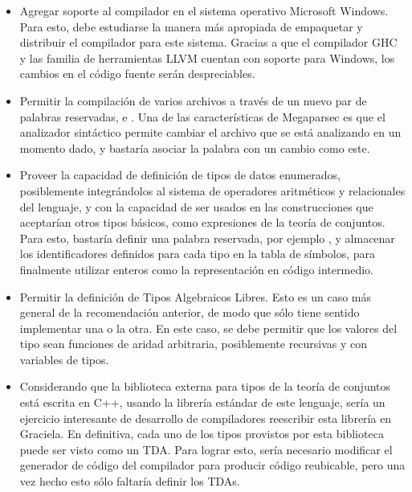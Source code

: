 \begin{itemize}

  \item Agregar soporte al compilador en el sistema operativo Microsoft Windows.
  Para esto, debe estudiarse la manera más apropiada de empaquetar y distribuir
  el compilador para este sistema. Gracias a que el compilador GHC y las familia
  de herramientas LLVM cuentan con soporte para Windows, los cambios en el
  código fuente serán despreciables.

  \item Permitir la compilación de varios archivos a través de un nuevo par de
  palabras reservadas,  e . Una de las
  características de Megaparsec es que el analizador sintáctico permite cambiar
  el archivo que se está analizando en un momento dado, y bastaría asociar la
  palabra  con un cambio como este.

  \item Proveer la capacidad de definición de tipos de datos enumerados,
  posiblemente integrándolos al sistema de operadores aritméticos y relacionales
  del lenguaje, y con la capacidad de ser usados en las construcciones que
  aceptarían otros tipos básicos, como expresiones de la teoría de conjuntos.
  Para esto, bastaría definir una palabra reservada, por ejemplo ,
  y almacenar los identificadores definidos para cada tipo en la tabla de símbolos,
  para finalmente utilizar enteros como la representación en código intermedio.

  \item Permitir la definición de Tipos Algebraicos Libres. Esto es un caso más
  general de la recomendación anterior, de modo que sólo tiene sentido
  implementar una o la otra. En este caso, se debe permitir que los valores del
  tipo sean funciones de aridad arbitraria, posiblemente recursivas y con
  variables de tipos.

  \item Considerando que la biblioteca externa para tipos de la teoría de
  conjuntos está escrita en C++, usando la librería estándar de este lenguaje,
  sería un ejercicio interesante de desarrollo de compiladores reescribir esta
  librería en Graciela. En definitiva, cada uno de los tipos provistos por esta
  biblioteca puede ser visto como un TDA. Para lograr esto, sería necesario
  modificar el generador de código del compilador para producir código
  reubicable, pero una vez hecho esto sólo faltaría definir los TDAs.


\end{itemize}
